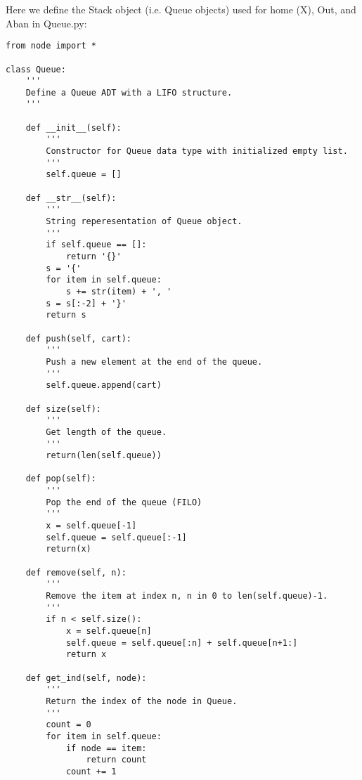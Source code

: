 \documentclass[english]{article}
\begin{document}
Here we define the Stack object (i.e. Queue objects) used for home (X), Out, and Aban in Queue.py:
\begin{singlespace}
\begin{verbatim}
from node import *

class Queue:
    '''
    Define a Queue ADT with a LIFO structure.
    '''
    
    def __init__(self):
        '''
        Constructor for Queue data type with initialized empty list.
        '''
        self.queue = []
        
    def __str__(self):
        '''
        String reperesentation of Queue object.
        '''
        if self.queue == []:
            return '{}'
        s = '{'
        for item in self.queue:
            s += str(item) + ', '
        s = s[:-2] + '}'
        return s
        
    def push(self, cart):
        '''
        Push a new element at the end of the queue.
        '''
        self.queue.append(cart)
        
    def size(self):
        '''
        Get length of the queue.
        '''
        return(len(self.queue))
        
    def pop(self):
        '''
        Pop the end of the queue (FILO)
        '''
        x = self.queue[-1]
        self.queue = self.queue[:-1]
        return(x)
    
    def remove(self, n):
        '''
        Remove the item at index n, n in 0 to len(self.queue)-1.
        '''
        if n < self.size():
            x = self.queue[n]
            self.queue = self.queue[:n] + self.queue[n+1:]
            return x
    
    def get_ind(self, node):
        '''
        Return the index of the node in Queue.
        '''
        count = 0
        for item in self.queue:
            if node == item:
                return count
            count += 1
\end{verbatim}
\end{singlespace}
\end{document}
